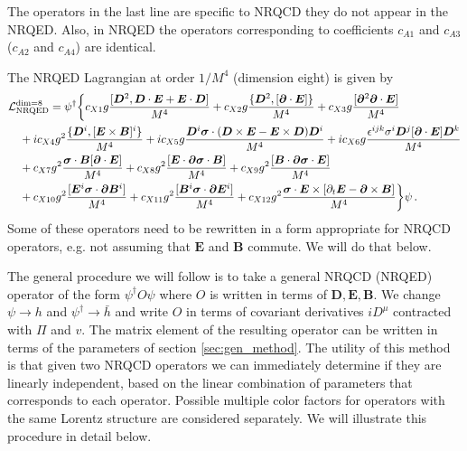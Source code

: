 The operators in the last line are specific to NRQCD they do not appear in the NRQED. Also, in NRQED the operators corresponding to coefficients $c_{A1}$ and $c_{A3}$ ($c_{A2}$ and $c_{A4}$) are identical.\par
The NRQED Lagrangian at order $1/M^4$ (dimension eight) is given by 
\vspace{-0.4cm}
\begin{align}\label{eqn:chap4_NRQED_Lag}
&{\cal L}_{\mbox{\scriptsize NRQED}}^{\mbox{\scriptsize dim$=$8}} = \psi^\dagger
  \bigg\{ 
c_{X1}g { [ \bm{D}^2 , \bm{D}\cdot \bm{E} + \bm{E}\cdot\bm{D} ] \over M^4 }
+ c_{X2}g { \{ \bm{D}^2 , [\bm{\partial}\cdot\bm{E}] \} \over M^4 }
+ c_{X3}g { [\bm{\partial}^2 \bm{\partial}\cdot\bm{E}] \over M^4 } \nonumber\\
&\quad 
+ i c_{X4}g^2 { \{ \bm{D}^i , [\bm{E}\times\bm{B}]^i \} \over M^4 } 
+ ic_{X5} g { \bm{D}^i \bm{\sigma}\cdot ( \bm{D}\times\bm{E} - \bm{E}\times\bm{D} )\bm{D}^i   \over M^4} 
+ ic_{X6} g { \epsilon^{ijk} \sigma^i \bm{D}^j [\bm{\partial}\cdot\bm{E}] \bm{D}^k \over M^4} 
\nonumber\\
&\quad
+ c_{X7} g^2 { \bm{\sigma}\cdot\bm{B} [\bm{\partial}\cdot\bm{E}] \over M^4} 
+ c_{X8} g^2 { [\bm{E}\cdot\bm{\partial} \bm{\sigma}\cdot\bm{B} ] \over M^4}
+ c_{X9} g^2 { [\bm{B}\cdot\bm{\partial} \bm{\sigma}\cdot\bm{E} ] \over M^4} 
\nonumber\\
&\quad
+ c_{X10} g^2 { [\bm{E}^i \bm{\sigma}\cdot\bm{\partial} \bm{B}^i] \over M^4}
+ c_{X11} g^2 { [\bm{B}^i \bm{\sigma}\cdot\bm{\partial} \bm{E}^i] \over M^4} 
+ c_{X12} g^2 { \bm{\sigma}\cdot \bm{E}\times [{\partial_t}\bm{E}-\bm{\partial}\times\bm{B} ] \over M^4} \bigg\} \psi  \,.
\end{align}
Some of these operators need to be rewritten in a form appropriate for NRQCD operators, e.g.  not assuming that $\bm{E}$ and $\bm{B}$ commute.  We will do that below. 

The general procedure we will follow is to take a  general NRQCD (NRQED) operator of the form $\psi^\dagger O\psi$ where $O$ is written in terms of $\bm {D},\bm{E},\bm{B}$. We change $\psi\to h$ and $\psi^\dagger\to \bar h$ and write $O$ in terms of covariant derivatives $iD^\mu$ contracted with $\Pi$ and $v$. The matrix element of the resulting operator can be written in terms of the  parameters of section \ref{sec:gen_method}. The utility of this method is that given two NRQCD operators we can immediately determine if they are linearly independent, based on the linear combination of parameters that corresponds to each operator. Possible multiple color factors for operators with the same Lorentz structure are considered separately.  We will illustrate this procedure in detail below. 
